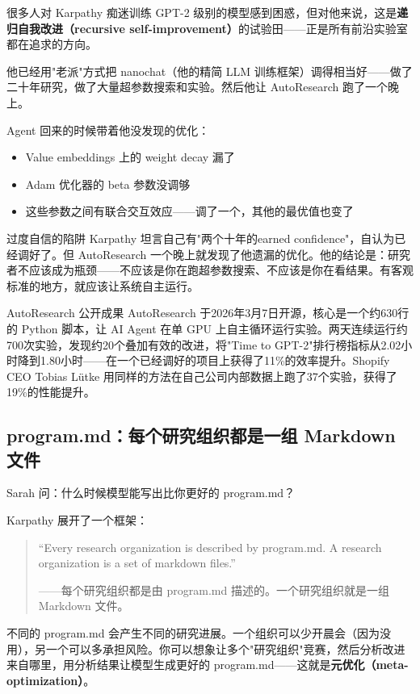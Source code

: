 \documentclass[a4paper]{article}
\begin{document}
很多人对 Karpathy 痴迷训练 GPT-2 级别的模型感到困惑，但对他来说，这是\textbf{递归自我改进（recursive self-improvement）}的试验田——正是所有前沿实验室都在追求的方向。

他已经用"老派"方式把 nanochat（他的精简 LLM 训练框架）调得相当好——做了二十年研究，做了大量超参数搜索和实验。然后他让 AutoResearch 跑了一个晚上。

Agent 回来的时候带着他没发现的优化：
\begin{itemize}
    \item Value embeddings 上的 weight decay 漏了
    \item Adam 优化器的 beta 参数没调够
    \item 这些参数之间有联合交互效应——调了一个，其他的最优值也变了
\end{itemize}

\begin{warningbox}{过度自信的陷阱}
Karpathy 坦言自己有"两个十年的earned confidence"，自认为已经调好了。但 AutoResearch 一个晚上就发现了他遗漏的优化。他的结论是：研究者不应该成为瓶颈——不应该是你在跑超参数搜索、不应该是你在看结果。有客观标准的地方，就应该让系统自主运行。
\end{warningbox}

\begin{knowledgebox}{AutoResearch 公开成果}
AutoResearch 于2026年3月7日开源，核心是一个约630行的 Python 脚本，让 AI Agent 在单 GPU 上自主循环运行实验。两天连续运行约700次实验，发现约20个叠加有效的改进，将"Time to GPT-2"排行榜指标从2.02小时降到1.80小时——在一个已经调好的项目上获得了11\%的效率提升。Shopify CEO Tobias L\"{u}tke 用同样的方法在自己公司内部数据上跑了37个实验，获得了19\%的性能提升。
\end{knowledgebox}

\subsection{program.md：每个研究组织都是一组 Markdown 文件}

Sarah 问：什么时候模型能写出比你更好的 program.md？

Karpathy 展开了一个框架：

\begin{quote}
``Every research organization is described by program.md. A research organization is a set of markdown files.''

——每个研究组织都是由 program.md 描述的。一个研究组织就是一组 Markdown 文件。
\end{quote}

不同的 program.md 会产生不同的研究进展。一个组织可以少开晨会（因为没用），另一个可以多承担风险。你可以想象让多个"研究组织"竞赛，然后分析改进来自哪里，用分析结果让模型生成更好的 program.md——这就是\textbf{元优化（meta-optimization）}。
\end{document}
